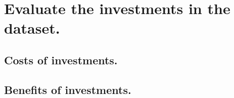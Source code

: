 \documentclass[letterpaper,10pt,english]{sphinxmanual}
\begin{document}
\noindent{}


\section{Evaluate the investments in the dataset.}
\label{\detokenize{example-analysis:evaluate-the-investments-in-the-dataset}}
\begin{sphinxVerbatim}[commandchars=\\\{\}]
   
\end{sphinxVerbatim}


\subsection{Costs of investments.}
\label{\detokenize{example-analysis:costs-of-investments}}
\begin{sphinxVerbatim}[commandchars=\\\{\}]
\end{sphinxVerbatim}




\subsection{Benefits of investments.}
\label{\detokenize{example-analysis:benefits-of-investments}}
\begin{sphinxVerbatim}[commandchars=\\\{\}]
  
\end{sphinxVerbatim}



\begin{sphinxVerbatim}[commandchars=\\\{\}]
  
\end{sphinxVerbatim}
\end{document}
